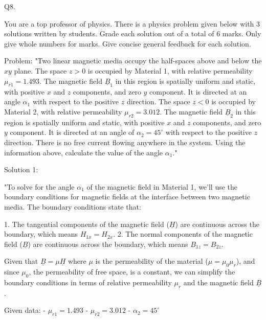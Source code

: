                               Q8. 

You are a top professor of physics. There is a physics problem given below with 3 solutions written by students. Grade each solution out of a total of 6 marks. Only give whole numbers for marks. Give concise general feedback for each solution. 

Problem:
"Two linear magnetic media occupy the half-spaces above and below the \( xy \) plane. The space \( z > 0 \) is occupied by Material 1, with relative permeability \( \mu_{r1} = 1.493 \). The magnetic field \( \underline{B}_{1} \) in this region is spatially uniform and static, with positive \( x \) and \( z \) components, and zero \( y \) component. It is directed at an angle \( \alpha_{1} \) with respect to the positive \( z \) direction. The space \( z < 0 \) is occupied by Material 2, with relative permeability \( \mu_{r2}= 3.012 \). The magnetic field \( \underline{B}_{2} \) in this region is spatially uniform and static, with positive \( x \) and \( z \) components, and zero \( y \) component. It is directed at an angle of \( \alpha_{2} = 45^\circ \) with respect to the positive \( z \) direction. There is no free current flowing anywhere in the system. Using the information above, calculate the value of the angle \( \alpha_{1} \)."

Solution 1:

"To solve for the angle \( \alpha_{1} \) of the magnetic field in Material 1, we'll use the boundary conditions for magnetic fields at the interface between two magnetic media. The boundary conditions state that:

1. The tangential components of the magnetic field (\( \underline{H} \)) are continuous across the boundary, which means \( H_{1x} = H_{2x} \).
2. The normal components of the magnetic field (\( \underline{B} \)) are continuous across the boundary, which means \( B_{1z} = B_{2z} \).

Given that \( \underline{B} = \mu \underline{H} \) where \( \mu \) is the permeability of the material (\( \mu = \mu_0 \mu_r \)), and since \( \mu_0 \), the permeability of free space, is a constant, we can simplify the boundary conditions in terms of relative permeability \( \mu_r \) and the magnetic field \( \underline{B} \).

Given data:
- \( \mu_{r1} = 1.493 \)
- \( \mu_{r2} = 3.012 \)
- \( \alpha_{2} = 45^\circ \)

